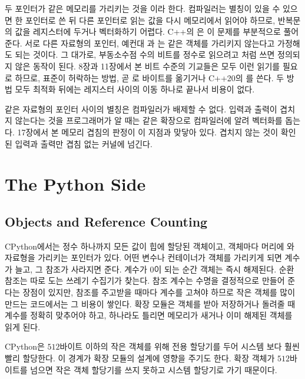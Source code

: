 두 포인터가 같은 메모리를 가리키는 것을 이라 한다. 컴파일러는 별칭이 있을 수 있으면 한 포인터로 쓴 뒤 다른 포인터로 읽는 값을 다시 메모리에서 읽어야 하므로, 반복문의 값을 레지스터에 두거나 벡터화하기 어렵다. C++의 은 이 문제를 부분적으로 풀어 준다. 서로 다른 자료형의 포인터, 예컨대 과 는 같은 객체를 가리키지 않는다고 가정해도 되는 것이다. 그 대가로, 부동소수점 수의 비트를 정수로 읽으려고 처럼 쓰면 정의되지 않은 동작이 된다. 8장과 11장에서 본 비트 수준의 기교들은 모두 이런 읽기를 필요로 하므로, 표준이 허락하는 방법, 곧 로 바이트를 옮기거나 C++20의 를 쓴다. 두 방법 모두 최적화 뒤에는 레지스터 사이의 이동 하나로 끝나서 비용이 없다.

같은 자료형의 포인터 사이의 별칭은 컴파일러가 배제할 수 없다. 입력과 출력이 겹치지 않는다는 것을 프로그래머가 알 때는  같은 확장으로 컴파일러에 알려 벡터화를 돕는다. 17장에서 본 메모리 겹침의 판정이 이 지점과 맞닿아 있다. 겹치지 않는 것이 확인된 입력과 출력만 겹침 없는 커널에 넘긴다.

\section{The Python Side}
\label{sec:python-side}

\subsection{Objects and Reference Counting}

CPython에서는 정수 하나까지 모든 값이 힙에 할당된 객체이고, 객체마다 머리에 와 자료형을 가리키는 포인터가 있다\cite{python-c-api}. 어떤 변수나 컨테이너가 객체를 가리키게 되면 계수가 늘고, 그 참조가 사라지면 준다. 계수가 $0$이 되는 순간 객체는 즉시 해제된다. 순환 참조는 따로 도는 쓰레기 수집기가 찾는다. 참조 계수는 수명을 결정적으로 만들어 준다는 장점이 있지만, 참조를 주고받을 때마다 계수를 고쳐야 하므로 작은 객체를 많이 만드는 코드에서는 그 비용이 쌓인다. 확장 모듈은 객체를 받아 저장하거나 돌려줄 때 계수를 정확히 맞추어야 하고, 하나라도 틀리면 메모리가 새거나 이미 해제된 객체를 읽게 된다.

CPython은 $512$바이트 이하의 작은 객체를 위해 전용 할당기를 두어 시스템 보다 훨씬 빨리 할당한다. 이 경계가 확장 모듈의 설계에 영향을 주기도 한다. 확장 객체가 $512$바이트를 넘으면 작은 객체 할당기를 쓰지 못하고 시스템 할당기로 가기 때문이다.

